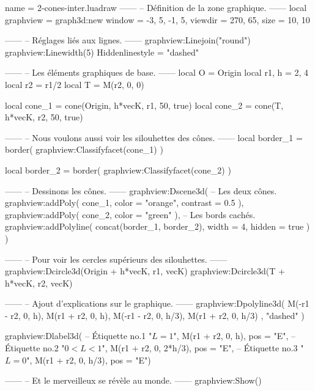 \documentclass{standalone}
\begin{document}
\begin{luadraw}{name = 2-cones-inter.luadraw}
------
-- Définition de la zone graphique.
------
local graphview = graph3d:new{
  window  = {-3, 5, -1, 5},
  viewdir = {270, 65},
  size    = {10, 10}
}

------
-- Réglages liés aux lignes.
------
graphview:Linejoin("round")
graphview:Linewidth(5)
Hiddenlinestyle = "dashed"

------
-- Les éléments graphiques de base.
------
local O     = Origin
local r1, h =  2, 4
local r2    = r1/2
local T     =  M(r2, 0, 0)

local cone_1 = cone(Origin, h*vecK, r1, 50, true)
local cone_2 = cone(T, h*vecK, r2, 50, true)

------
-- Nous voulons aussi voir les silouhettes des cônes.
------
local border_1 = border(
  graphview:Classifyfacet(cone_1)
)

local border_2 = border(
  graphview:Classifyfacet(cone_2)
)

------
-- Dessinons les cônes.
------
graphview:Dscene3d(
-- Les deux cônes.
  graphview:addPoly(
    cone_1,
    {
      color    = "orange",
      contrast = 0.5
    }),
  graphview:addPoly(
    cone_2,
    {
      color = "green"
    }),
-- Les bords cachés.
  graphview:addPolyline(
    concat(border_1, border_2),
    {
      width  = 4,
      hidden = true
    })
)

------
-- Pour voir les cercles supérieurs des silouhettes.
------
graphview:Dcircle3d(Origin + h*vecK, r1, vecK)
graphview:Dcircle3d(T + h*vecK, r2, vecK)

------
-- Ajout d'explications sur le graphique.
------
graphview:Dpolyline3d(
  {
    {M(-r1 - r2,  0,  h), M(r1 + r2,  0,  h)},
    {M(-r1 - r2,  0,  h/3), M(r1 + r2,  0,  h/3)}
  },
  "dashed"
)

graphview:Dlabel3d(
-- Étiquette no.1
  "$L = 1$",
  M(r1 + r2, 0, h),
  {pos = "E"},
-- Étiquette no.2
  "$0 < L <1$",
  M(r1 + r2, 0, 2*h/3),
  {pos = "E"},
-- Étiquette no.3
  "$L = 0$",
  M(r1 + r2, 0, h/3),
  {pos = "E"})

------
-- Et le merveilleux se révèle au monde.
------
graphview:Show()
\end{luadraw}
\end{document}
